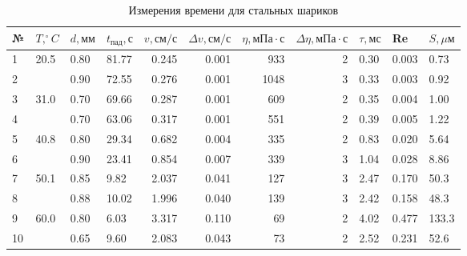 \documentclass[a4paper,12pt]{article}
\begin{document}
\begin{enumerate}
		\begin{table}
		\caption{Измерения времени для стальных шариков}
		\begin{center}
			\begin{tabular}{|l|l|l|l|rr|rr|lll|}
				\hline
				{№} & {$T, ^\circ C$} & {$d, мм$} & {$t_{пад}, с$} & {$v, см/с$} & {$\Delta v, см/с$} & {$\eta, мПа \cdot с$} & {$\Delta\eta, мПа \cdot с$} &  {$\tau, мс$} & {Re} & {$S, \mu м$} \\
				\hline
				1 & 20.5 & 0.80 & 81.77 & 0.245 & 0.001 & 933 & 2 & 0.30 & 0.003 & 0.73 \\
				2 &      & 0.90 & 72.55 & 0.276 & 0.001 &1048 & 3 & 0.33 & 0.003 & 0.92 \\ \hline
				3 & 31.0 & 0.70 & 69.66 & 0.287 & 0.001 & 609 & 2 & 0.35 & 0.004 & 1.00 \\
				4 &      & 0.70 & 63.06 & 0.317 & 0.001 & 551 & 2 & 0.39 & 0.005 & 1.22 \\ \hline
				5 & 40.8 & 0.80 & 29.34 & 0.682 & 0.004 & 335 & 2 & 0.83 & 0.020 & 5.64 \\
				6 &      & 0.90 & 23.41 & 0.854 & 0.007 & 339 & 3 & 1.04 & 0.028 & 8.86 \\ \hline
				7 & 50.1 & 0.85 &  9.82 & 2.037 & 0.041 & 127 & 3 & 2.47 & 0.170 & 50.3 \\
				8 &      & 0.88 & 10.02 & 1.996 & 0.040 & 139 & 3 & 2.42 & 0.158 & 48.3 \\ \hline
				9 & 60.0 & 0.80 &  6.03 & 3.317 & 0.110 &  69 & 2 & 4.02 & 0.477 & 133.3 \\
				10 &     & 0.65 &  9.60 & 2.083 & 0.043 &  73 & 2 & 2.52 & 0.231 & 52.6 \\ \hline
			\end{tabular}
		\end{center}
	\end{table}


\end{enumerate}
\end{document}
